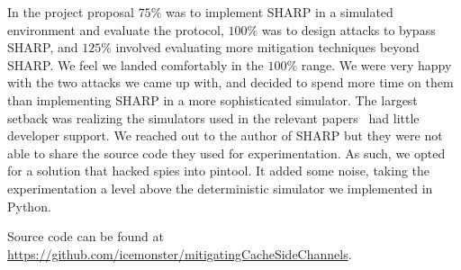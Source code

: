 \documentclass[12pt]{article}
\begin{document}
In the project proposal $75\%$ was to implement SHARP in a simulated environment and evaluate the protocol, $100\%$ was to design attacks to bypass SHARP, and $125\%$ involved evaluating more mitigation techniques beyond SHARP. 
We feel we landed comfortably in the $100\%$ range.
We were very happy with the two attacks we came up with, and decided to spend more time on them than implementing SHARP in a more sophisticated simulator.
The largest setback was realizing the simulators used in the relevant papers~\cite{sharp,howSharp} had little developer support.
We reached out to the author of SHARP but they were not able to share the source code they used for experimentation.
As such, we opted for a solution that hacked spies into pintool.
It added some noise, taking the experimentation a level above the deterministic simulator we implemented in Python.

Source code can be found at\\ \url{https://github.com/icemonster/mitigatingCacheSideChannels}.


\newpage



\end{document}
